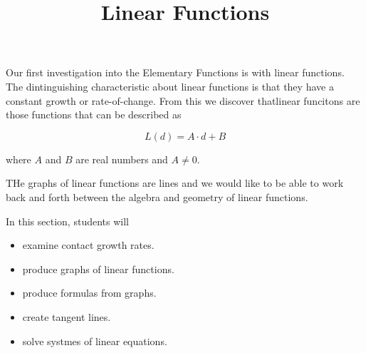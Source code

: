 \documentclass{ximera}
\title{Linear Functions}
\begin{document}
\begin{abstract}
\end{abstract}
\maketitle









Our first investigation into the Elementary Functions is with linear functions. The dintinguishing characteristic about linear functions is that they have a constant growth or rate-of-change.  From this we discover thatlinear funcitons are those functions that can be described as

\[  L(d) = A \cdot d + B \]

where $A$ and $B$ are real numbers and $A \ne 0$.


THe graphs of linear functions are lines and we would like to be able to work back and forth between the algebra and geometry of linear functions.




















\begin{sectionOutcomes}
In this section, students will 

\begin{itemize}
\item examine contact growth rates.
\item produce graphs of linear functions.
\item produce formulas from graphs.
\item create tangent lines.
\item solve systmes of linear equations.
\end{itemize}
\end{sectionOutcomes}
\end{document}
